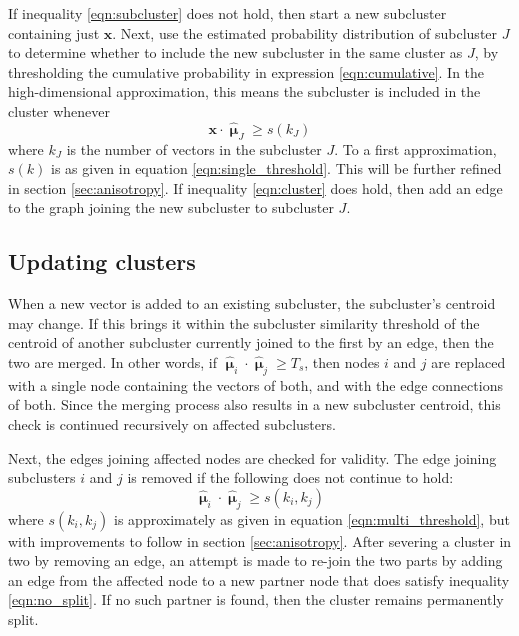 \documentclass{article}
\begin{document}
If inequality \ref{eqn:subcluster} does not hold, then start a new subcluster containing just $\mathbf{x}$. Next, use the estimated probability distribution of subcluster $J$ to determine whether to include the new subcluster in the same cluster as $J$, by thresholding the cumulative probability in expression \ref{eqn:cumulative}. In the high-dimensional approximation, this means the subcluster is included in the cluster whenever
\begin{equation}\label{eqn:cluster}
\mathbf{x}\cdot\bm{\hat{\upmu}}_J\geq s(k_J)
\end{equation}
where $k_J$ is the number of vectors in the subcluster $J$. To a first approximation, $s(k)$ is as given in equation \ref{eqn:single_threshold}. This will be further refined in section \ref{sec:anisotropy}. If inequality \ref{eqn:cluster} does hold, then add an edge to the graph joining the new subcluster to subcluster $J$.

\subsection{Updating clusters}
\label{sec:updating}

When a new vector is added to an existing subcluster, the subcluster's centroid may change. If this brings it within the subcluster similarity threshold of the centroid of another subcluster currently joined to the first by an edge, then the two are merged. In other words, if $\bm{\hat{\upmu}}_i\cdot\bm{\hat{\upmu}}_j\geq T_s$, then nodes $i$ and $j$ are replaced with a single node containing the vectors of both, and with the edge connections of both. Since the merging process also results in a new subcluster centroid, this check is continued recursively on affected subclusters.

Next, the edges joining affected nodes are checked for validity. The edge joining subclusters $i$ and $j$ is removed if the following does not continue to hold:
\begin{equation}\label{eqn:no_split}
\bm{\hat{\upmu}}_i\cdot\bm{\hat{\upmu}}_j\geq s(k_i,k_j)
\end{equation}
where $s(k_i,k_j)$ is approximately as given in equation \ref{eqn:multi_threshold}, but with improvements to follow in section \ref{sec:anisotropy}. After severing a cluster in two by removing an edge, an attempt is made to re-join the two parts by adding an edge from the affected node to a new partner node that does satisfy inequality \ref{eqn:no_split}. If no such partner is found, then the cluster remains permanently split.
\end{document}
